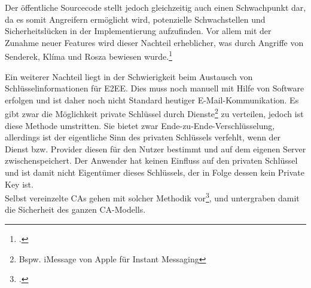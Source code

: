 \documentclass  [paper=a4,
				fontsize=12pt,
				listof=totoc,
				bibliography=totoc
				]{scrreprt}
\begin{document}
				
			
			
				Der öffentliche Sourcecode stellt jedoch gleichzeitig auch einen Schwachpunkt dar, da es somit Angreifern ermöglicht wird, potenzielle Schwachstellen und Sicherheitslücken in der Implementierung aufzufinden. Vor allem mit der Zunahme neuer Features wird dieser Nachteil erheblicher, was durch Angriffe von Senderek, Klíma und Rosza bewiesen wurde.\footcite[Vgl.][S. 47-55]{Schwenk}
				
				Ein weiterer Nachteil liegt in der Schwierigkeit beim Austausch von Schlüsselinformationen für \ac{E2EE}. Dies muss noch manuell mit Hilfe von Software erfolgen und ist daher noch nicht Standard heutiger E-Mail-Kommunikation. 
				Es gibt zwar die Möglichkeit private Schlüssel durch Dienste\footnote{Bspw. iMessage von Apple für Instant Messaging} zu verteilen, jedoch ist diese Methode umstritten. Sie bietet zwar Ende-zu-Ende-Verschlüsselung, allerdings ist der eigentliche Sinn des privaten Schlüssels verfehlt, wenn der Dienst bzw. Provider diesen für den Nutzer bestimmt und auf dem eigenen Server zwischenspeichert. Der Anwender hat keinen Einfluss auf den privaten Schlüssel und ist damit nicht Eigentümer dieses Schlüssels, der in Folge dessen kein Private Key ist.\\
				Selbst vereinzelte \ac{CA}s gehen mit solcher Methodik vor\footcite[Vgl.][]{Kaps2014}, und untergraben damit die Sicherheit des ganzen \ac{CA}-Modells. \medskip\\
				

%				
%				
%				
%				
				
\end{document}
